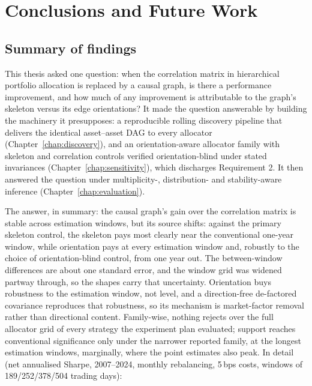 \chapter{Conclusions and Future Work}
\label{chap:conclusion}

\section{Summary of findings}
\label{sec:summary}

This thesis asked one question: when the correlation matrix in
hierarchical portfolio allocation is replaced by a causal graph, is
there a performance improvement, and how much of any improvement is
attributable to the graph's skeleton
versus its edge orientations? It made the question answerable by building
the
machinery it presupposes: a reproducible rolling discovery pipeline that
delivers the identical asset--asset DAG to every allocator
(Chapter~\ref{chap:discovery}), and an orientation-aware allocator family
with skeleton and correlation controls verified orientation-blind under
stated invariances (Chapter~\ref{chap:sensitivity}), which discharges
Requirement 2. It then answered the question under multiplicity-,
distribution- and stability-aware inference (Chapter~\ref{chap:evaluation}).

The answer, in summary: the causal graph's gain over the
correlation matrix is stable across estimation windows, but its source
shifts: against the primary skeleton control, the skeleton pays most
clearly near the conventional one-year window, while orientation pays at
every estimation window and, robustly to the choice of orientation-blind control,
from one year out. The between-window differences are about one standard
error, and the window grid was widened partway through, so the shapes
carry that uncertainty. Orientation buys robustness to the estimation
window, not level, and a direction-free de-factored covariance
reproduces that robustness, so its mechanism is market-factor removal
rather than directional content. Family-wise, nothing rejects over the
full allocator grid of every strategy the experiment plan evaluated;
support reaches conventional significance
only under the narrower reported family, at the longest estimation windows,
marginally, where the point estimates also peak. In detail (net annualised Sharpe, 2007--2024,
monthly
rebalancing, 5\,bps costs, windows of 189/252/378/504 trading days):


